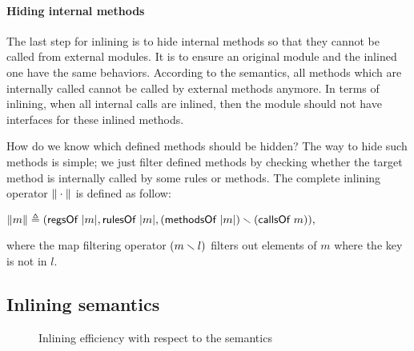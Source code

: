 \paragraph{Hiding internal methods}

The last step for inlining is to hide internal methods so that they
cannot be called from external modules. It is to ensure an original
module and the inlined one have the same behaviors. According to the
semantics, all methods which are internally called cannot be called by
external methods anymore. In terms of inlining, when all internal
calls are inlined, then the module should not have interfaces for
these inlined methods.

How do we know which defined methods should be hidden? The way to hide
such methods is simple; we just filter defined methods by checking
whether the target method is internally called by some rules or
methods. The complete inlining operator $\| \cdot \|$ is defined
as follow:

\begin{definition}
  \label{def-inlineF}
  \mbox{}
  \begin{center}
    \begin{math}
      \| m \| \triangleq
      (\textsf{regsOf}\ | m |,
      \textsf{rulesOf}\ | m |,
      (\textsf{methodsOf}\ | m |) \smallsetminus{} (\textsf{callsOf}\ m)),
    \end{math}
  \end{center}
\end{definition}
where the map filtering operator $(m \smallsetminus{} l)$ filters out
elements of $m$ where the key is not in $l$.

\subsection{Inlining semantics}

\begin{figure}[t]
  \begin{subfigure}[b]{0.5\textwidth}
  \end{subfigure}
  \begin{subfigure}[b]{0.5\textwidth}
  \end{subfigure}
  \caption{Inlining efficiency with respect to the \Step{} semantics}
  \label{ex-inlining-efficiency}
\end{figure}

